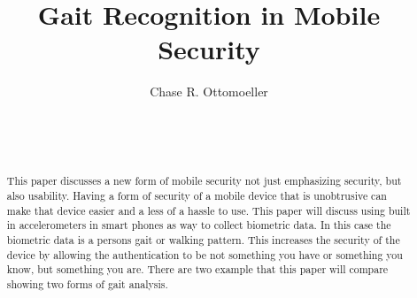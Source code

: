 \documentclass{sig-alternate}
\begin{document}

\title{Gait Recognition in Mobile Security}


\author{
\alignauthor
Chase R. Ottomoeller\\
	\\
	\\
	\\
}

\maketitle
\begin{abstract}
This paper discusses a new form of mobile security not just emphasizing security, but also usability. Having a form of security of a mobile device that is unobtrusive can make that device easier and a less of a hassle to use. This paper will discuss using built in accelerometers in smart phones as way to collect biometric data. In this case the biometric data is a persons gait or walking pattern. This increases the security of the device by allowing the authentication to be not something you have or something you know, but something you are. There are two example that this paper will compare showing two forms of gait analysis. 
\end{abstract}

\end{document}
